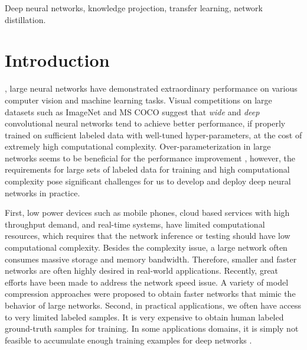 \documentclass[journal]{IEEEtran}
\begin{document}
\begin{IEEEkeywords}
Deep neural networks, knowledge projection, transfer learning, network distillation.
\end{IEEEkeywords}



\renewcommand{\baselinestretch}{2.1}


\IEEEpeerreviewmaketitle



\section{Introduction}


, large neural networks have demonstrated extraordinary performance on various computer vision and machine learning tasks. Visual competitions on large datasets such as ImageNet \cite{ILSVRC15} and MS COCO \cite{MSCOCO} suggest that \textit{wide} and \textit{deep} convolutional neural networks tend to achieve better performance, if properly trained on sufficient labeled data with well-tuned hyper-parameters, at the cost of extremely high computational complexity. Over-parameterization in large networks seems to be beneficial for the performance improvement \cite{denil2013predicting, hinton2012improving}, however,
the requirements for large sets of labeled data for training and high computational complexity pose significant challenges for us to develop and deploy deep neural networks in practice. 

First, low power devices such as mobile phones, cloud based services with high throughput demand, and real-time systems, 
have limited computational resources, which requires that the network inference or testing should have low computational complexity. 
Besides the complexity issue, a large network often consumes massive storage and memory bandwidth. Therefore, smaller and faster networks are often highly desired  in real-world applications.
Recently, great efforts have been made to address the network speed issue. A variety of model compression approaches \cite{NIPS1989_250,hassibi1993second,han2015deep,jaderberg2014speeding,hinton2015distilling} were proposed to obtain faster networks that mimic the behavior of large networks. 
Second, in practical applications,  we often have access to very limited labeled samples. It is very expensive to obtain human labeled ground-truth samples for training. In some applications domains, 
it is simply not feasible to accumulate enough training examples for deep networks  \cite{pan2011domain,zhang2013domain,wang2014flexible,tzeng2015simultaneous} 
.
\end{document}

